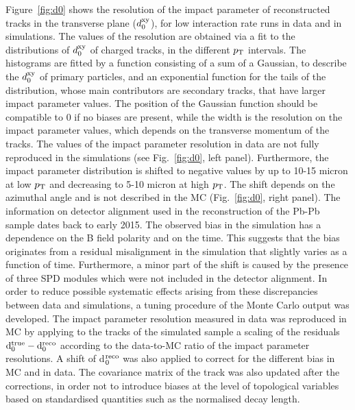 Figure~\ref{fig:d0} shows the resolution of the impact parameter of reconstructed tracks 
in the transverse plane ($d_{\rm 0}^{\rm xy}$), for low interaction rate runs in data and in simulations.
The values of the resolution are obtained via a fit to the distributions of $d_{\rm 0}^{\rm xy}$ 
of charged tracks, in the different $p_{\rm T}$ intervals. The histograms are fitted by a function consisting of a sum
of a Gaussian, to describe the $d_{\rm 0}^{\rm xy}$ of primary particles, and an exponential
function for the tails of the distribution, whose main contributors are secondary tracks,
that have larger impact parameter values. The position of the Gaussian function
should be compatible to 0 if no biases are present, while the width is
the resolution on the impact parameter values, which depends on the transverse momentum of the tracks.
The values of the impact parameter resolution in data are not fully reproduced
in the simulations (see Fig.~\ref{fig:d0}, left panel).
Furthermore, the impact parameter distribution is shifted to negative 
values by up to 10-15 micron at low $p_{\rm T}$ and 
decreasing to 5-10 micron at high $p_{\rm T}$. The shift 
depends on the azimuthal angle and is not described 
in the MC (Fig.~\ref{fig:d0}, right panel). 
The information on detector alignment used in the reconstruction of the Pb-Pb sample dates back to early 2015.
The observed bias in the simulation has a dependence on the B field polarity and on the time.
This suggests that the bias originates from a residual misalignment in the simulation
that slightly varies as a function of time. Furthermore, a minor part of the shift is caused
by the presence of three SPD modules which were not included in the detector alignment.
In order to reduce possible systematic effects arising from these discrepancies
between data and simulations, a tuning procedure of the Monte Carlo output
was developed.
 The impact parameter resolution measured in data 
 was reproduced in MC by applying to the tracks of the simulated sample a scaling of 
the residuals ${\rm d}_0^{\rm true}-{\rm d}_0^{\rm reco}$ 
 according to the data-to-MC ratio of the impact parameter 
 resolutions. A shift of d$_0^{\rm reco}$ was also applied to correct for the different bias in MC and in data.
 The covariance matrix of the track was also
 updated after the corrections, in order not to introduce biases at the level
 of topological variables based on standardised quantities such as the normalised decay length. \\
 


